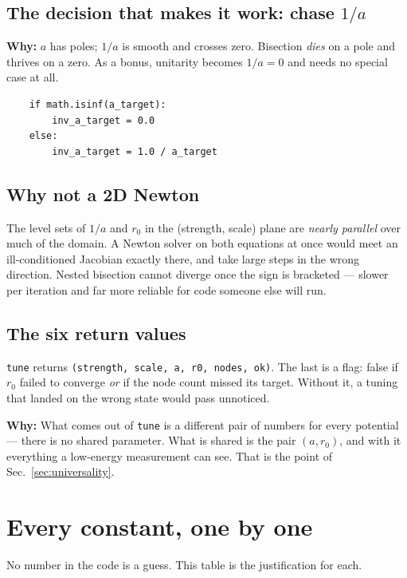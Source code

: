\documentclass[11pt,a4paper]{article}
\newcommand{\why}[1]{\medskip\noindent\textbf{Why:} #1\medskip}
\begin{document}
\subsection*{The decision that makes it work: chase $1/a$}

\why{$a$ has poles; $1/a$ is smooth and crosses zero. Bisection \emph{dies} on a
pole and thrives on a zero. As a bonus, unitarity becomes $1/a = 0$ and needs no
special case at all.}

\begin{lstlisting}
    if math.isinf(a_target):
        inv_a_target = 0.0
    else:
        inv_a_target = 1.0 / a_target
\end{lstlisting}

\subsection*{Why not a 2D Newton}

The level sets of $1/a$ and $r_0$ in the (strength, scale) plane are
\emph{nearly parallel} over much of the domain. A Newton solver on both
equations at once would meet an ill-conditioned Jacobian exactly there, and take
large steps in the wrong direction. Nested bisection cannot diverge once the
sign is bracketed --- slower per iteration and far more reliable for code
someone else will run.

\subsection*{The six return values}

\texttt{tune} returns \texttt{(strength, scale, a, r0, nodes, ok)}. The last is a
flag: false if $r_0$ failed to converge \emph{or} if the node count missed its
target. Without it, a tuning that landed on the wrong state would pass unnoticed.

\why{What comes out of \texttt{tune} is a different pair of numbers for every
potential --- there is no shared parameter. What is shared is the pair
$(a, r_0)$, and with it everything a low-energy measurement can see. That is the
point of Sec.~\ref{sec:universality}.}

\section{Every constant, one by one}
\label{sec:constants}

No number in the code is a guess. This table is the justification for each.
\end{document}
